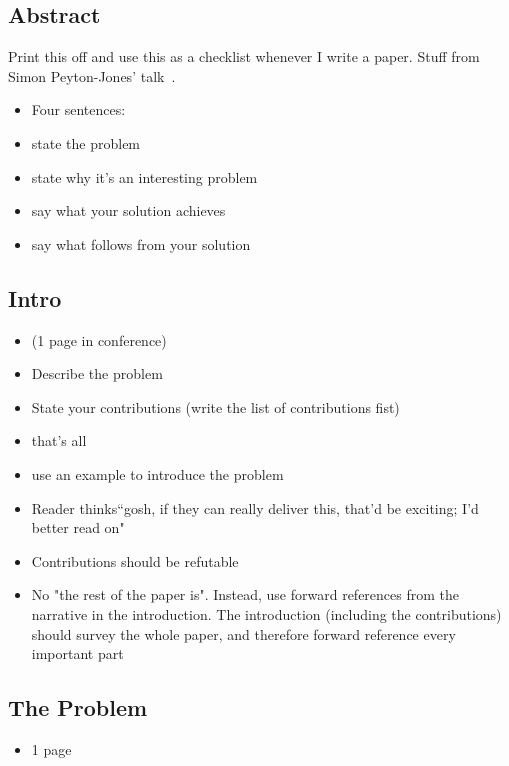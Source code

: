 \subsection{Abstract}
Print this off and use this as a checklist whenever I write a paper.
Stuff from Simon Peyton-Jones' talk~\cite{jones2013how}.

\begin{itemize}
\item Four sentences:
\item state the problem
\item state why it's an interesting problem
\item say what your solution achieves
\item say what follows from your solution
\end{itemize}

\subsection{Intro}
\begin{itemize}
\item (1 page in conference)
\item Describe the problem
\item State your contributions (write the list of contributions fist)
\item that's all
\item use an example to introduce the problem
\item Reader thinks``gosh, if they can really deliver this, that'd be exciting; I’d better read on" \cite{jones2013how}
\item Contributions should be refutable
\item No "the rest of the paper is". Instead, use forward references from the narrative in the introduction. The introduction (including the contributions) should survey the whole paper, and therefore forward reference every important part
\end{itemize}

\subsection{The Problem}
\begin{itemize}
\item 1 page
\end{itemize}

